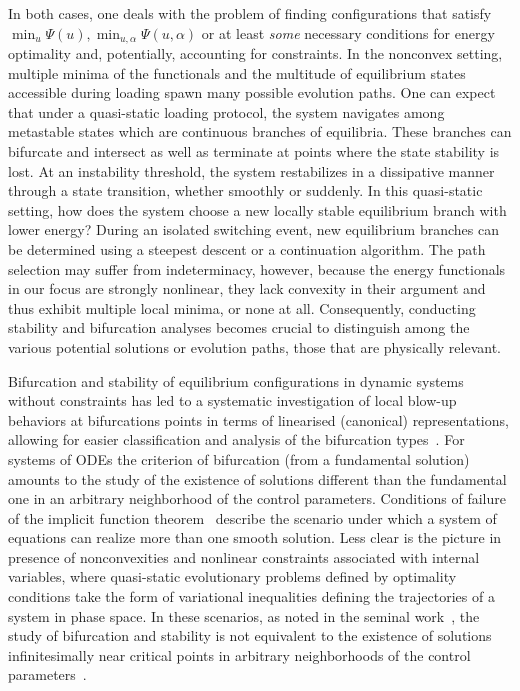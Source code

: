 \documentclass[10pt]{article}
\begin{document}
In both cases, one deals with the problem of finding  configurations that satisfy
$\min_{{u}} \Psi({u}), \min_{{u},\alpha} \Psi({u},\alpha)$
or at least \emph{some} necessary conditions for energy optimality and, potentially, accounting for constraints.
In the nonconvex setting, multiple minima of the functionals and the multitude of equilibrium states accessible during loading spawn many possible evolution paths. One can expect that under a quasi-static loading protocol, the system navigates among metastable states which are continuous branches of equilibria. These branches can bifurcate and intersect as well as terminate at points where the state stability is lost.
%
At an instability threshold, the system restabilizes in a dissipative manner through a state transition, whether smoothly or suddenly.
In this quasi-static setting, how does the system choose a new locally stable equilibrium branch with lower energy?
During an isolated switching event, new equilibrium branches can be determined using a steepest descent or a continuation algorithm. The path selection may suffer from indeterminacy, however, because the energy functionals in our focus are strongly nonlinear, they lack convexity in their argument and thus exhibit multiple local minima, or none at all.
Consequently, conducting stability and bifurcation analyses becomes crucial to distinguish among the various potential solutions or evolution paths, those that are physically relevant.

Bifurcation and stability of equilibrium configurations in dynamic systems without constraints has led to a systematic investigation of local blow-up behaviors at bifurcations points in terms of linearised (canonical) representations, allowing for easier classification and analysis of the bifurcation types~\cite{Iooss2012-el}.
For systems of ODEs the criterion  of bifurcation (from a fundamental solution) amounts to the study of the existence of solutions different than the fundamental one in an arbitrary neighborhood of the control parameters. Conditions of failure of the implicit function theorem~\cite{Iooss2012-el} describe the scenario under which a system of equations can realize more than one smooth solution.
Less clear is the picture in presence of nonconvexities and nonlinear constraints associated with internal variables, where quasi-static evolutionary problems defined by optimality conditions take the form of variational inequalities defining the trajectories of a system in phase space. In these scenarios, as noted in the seminal work~\cite{Hill1958-xd}, the study of bifurcation and stability is not equivalent to the existence of solutions infinitesimally near critical points in arbitrary neighborhoods of the control parameters~\cite{Bazant2010-zb}.
\end{document}
